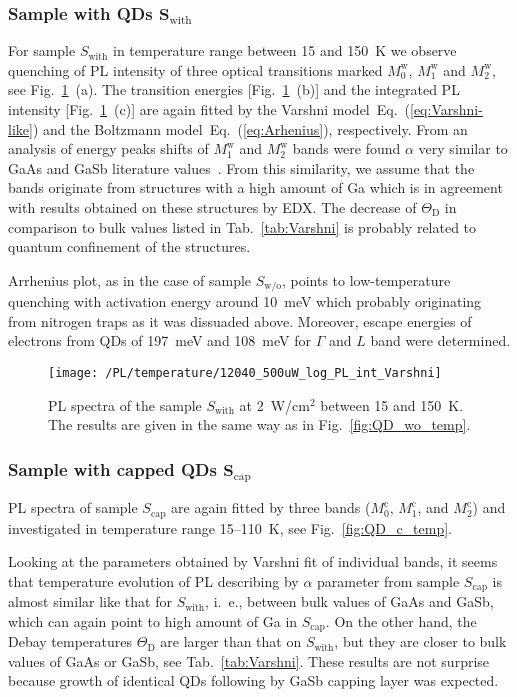 \subsubsection*{Sample with QDs $\mathbf{S_\mathrm{with}}$}
%
For sample $S_\mathrm{with}$ in temperature range between 15 and 150~K we observe quenching of PL intensity of three optical transitions marked $M_0^\mathrm{w}$, $M_1^\mathrm{w}$ and $M_2^\mathrm{w}$, see Fig.~\ref{fig:QD_w_temp}~(a). The transition energies [Fig.~\ref{fig:QD_w_temp}~(b)] and the integrated PL intensity [Fig.~\ref{fig:QD_w_temp}~(c)] are again fitted by the Varshni model~Eq.~(\ref{eq:Varshni-like}) and the Boltzmann model~Eq.~(\ref{eq:Arhenius}), respectively. %
%
From an analysis of energy peaks shifts of $M_1^\mathrm{w}$ and $M_2^\mathrm{w}$ bands were found $\alpha$ very similar to GaAs and GaSb literature values~\cite{Vurgaftman}. From this similarity, we assume that the bands originate from structures with a high amount of Ga which is in agreement with results obtained on these structures by EDX. The decrease of $\Theta_\mathrm{D}$ in comparison to bulk values listed in Tab.~\ref{tab:Varshni} is probably related to quantum confinement of the structures.

Arrhenius plot, as in the case of sample $S_\mathrm{w/o}$, points to low-temperature quenching with activation energy around 10~meV which probably originating from nitrogen traps as it was dissuaded above. Moreover, escape energies of electrons from QDs of 197~meV and 108~meV for $\Gamma$ and $L$ band were determined. 
%
\begin{figure}
	\centering
	\texttt{[image: /PL/temperature/12040\_500uW\_log\_PL\_int\_Varshni]}
	\caption{PL spectra of the sample ${S_\mathrm{with}}$ at 2~W/cm$^2$ between 15 and 150~K. The results are given in the same way as in Fig.~\ref{fig:QD_wo_temp}.}
	\label{fig:QD_w_temp}
\end{figure}

\subsubsection*{Sample with capped QDs $\mathbf{S_\mathrm{cap}}$}
%
PL spectra of sample ${S_\mathrm{cap}}$ are again fitted by three bands ($M_0^\mathrm{c}$, $M_1^\mathrm{c}$, and $M_2^\mathrm{c}$) and investigated in temperature range 15--110~K, see Fig.~\ref{fig:QD_c_temp}.

Looking at the parameters obtained by Varshni fit of individual bands, it seems that temperature evolution of PL describing by $\alpha$ parameter from sample ${S_\mathrm{cap}}$ is almost similar like that for ${S_\mathrm{with}}$, i.~e., between bulk values of GaAs and GaSb, which can again point to high amount of Ga in ${S_\mathrm{cap}}$. On the other hand, the Debay temperatures $\Theta_\mathrm{D}$ are larger than that on ${S_\mathrm{with}}$, but they are closer to bulk values of GaAs or GaSb, see Tab.~\ref{tab:Varshni}. These results are not surprise because growth of identical QDs following by GaSb capping layer was expected.


